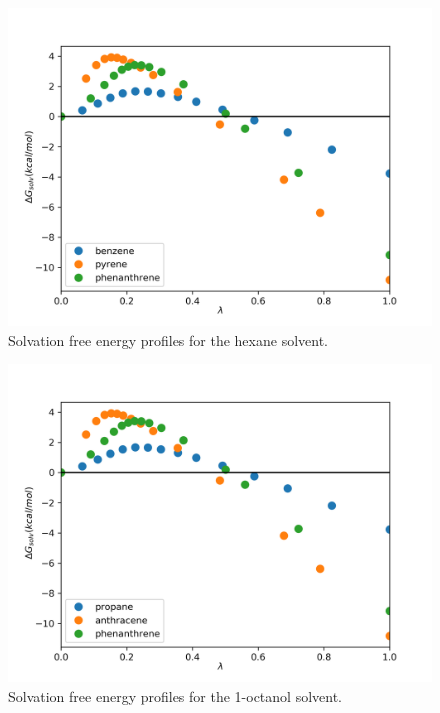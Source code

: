 \begin{figure}[H]
\centering
\includegraphics[width=0.9\linewidth]{Figures/hex}
\caption{Solvation free energy profiles for the hexane solvent.}
\label{fig:hex}
\end{figure}

\begin{figure}[H]
	\centering
	\includegraphics[width=0.9\linewidth]{Figures/oct}
	\caption{Solvation free energy profiles for the 1-octanol solvent.}
	\label{fig:oct}
\end{figure}

